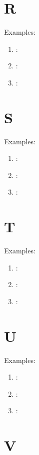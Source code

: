 \section*{R}

Examples:
\begin{enumerate}
    \item \textbf{}: \textipa{[]}
    \item \textbf{}: \textipa{[]}
    \item \textbf{}: \textipa{[]}
\end{enumerate}

\section*{S}

Examples:
\begin{enumerate}
    \item \textbf{}: \textipa{[]}
    \item \textbf{}: \textipa{[]}
    \item \textbf{}: \textipa{[]}
\end{enumerate}

\section*{T}

Examples:
\begin{enumerate}
    \item \textbf{}: \textipa{[]}
    \item \textbf{}: \textipa{[]}
    \item \textbf{}: \textipa{[]}
\end{enumerate}

\section*{U}

Examples:
\begin{enumerate}
    \item \textbf{}: \textipa{[]}
    \item \textbf{}: \textipa{[]}
    \item \textbf{}: \textipa{[]}
\end{enumerate}

\section*{V}

